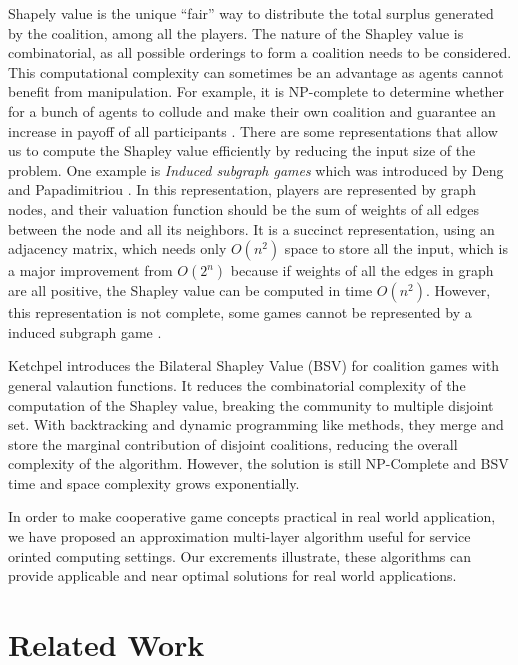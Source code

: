         Shapely value is the unique ``fair'' way to distribute the total surplus generated by the coalition, among all the players.
        The nature of the Shapley value is combinatorial, as all possible orderings to form a
        coalition needs to be considered. This computational complexity can sometimes be
        an advantage as agents cannot benefit from manipulation. For example, it is NP-complete
        to determine whether for a bunch of agents to collude and make their own coalition and guarantee
        an increase in payoff of all participants \cite{conf/aaai/YokooCSOI05}.
        There are some representations that allow us to compute the Shapley value efficiently by reducing the input size of the problem.
        One example is \emph{Induced subgraph games}
        which was introduced by Deng and Papadimitriou \cite{Deng94}. In this representation, players are represented by graph nodes, and
        their valuation function should be the sum of weights of all edges between the node and all its neighbors. It is a succinct representation, using
        an adjacency matrix, which needs only $O(n^2)$ space to store all the input, which is a major improvement from $O(2^n)$ because
        if weights of all the edges in graph are all positive, the Shapley value can be computed in time $O(n^2)$.
        However, this representation is not complete, some games cannot be represented by a induced subgraph game \cite{conf/aaai/YokooCSOI05}.

        Ketchpel introduces the Bilateral Shapley Value (BSV) \cite{conf/aaai/Ketchpel94a} for coalition games with general valaution functions.
        It reduces the combinatorial complexity of the computation of the Shapley value, breaking the community to multiple disjoint set.
        With backtracking and dynamic programming like methods, they merge and store the marginal contribution of disjoint coalitions,
        reducing the overall complexity of the algorithm. However, the solution is still NP-Complete and BSV time and space complexity grows exponentially.

        In order to make cooperative game concepts practical in real world application, we have proposed an approximation multi-layer
        algorithm useful for service orinted computing settings. Our excrements illustrate, these algorithms can provide
        applicable and near optimal solutions for real world applications.
        
        
\section{Related Work}\label{sec:BRRelatedWork}

